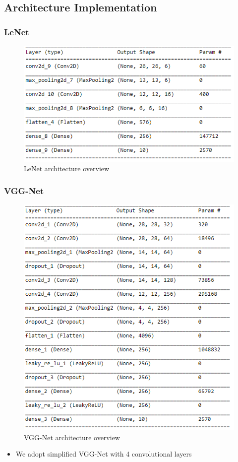 \documentclass{beamer}
\begin{document}
\subsection{Architecture Implementation}
\begin{frame}\frametitle{LeNet}
\begin{figure}[h]
	\includegraphics[scale=0.5]{figures/lenet_arch}
	\centering
	\caption{LeNet architecture overview}
	\label{fig:lenet_arch}
\end{figure}

\end{frame}
\begin{frame}\frametitle{VGG-Net}
\begin{figure}[h]
	\includegraphics[scale=0.5]{figures/vgg_arch}
	\centering
	\caption{VGG-Net architecture overview}
	\label{fig:vggnet_arch}
\end{figure}
\begin{itemize}
	\item We adopt simplified VGG-Net with 4 convolutional layers 
\end{itemize} 
\end{frame}
\end{document}
